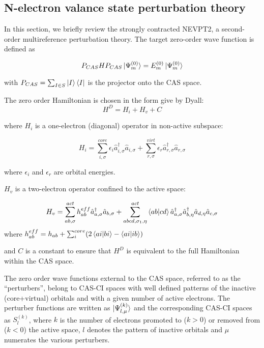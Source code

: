 \subsection{N-electron valance state perturbation theory} 

In this section, we briefly review the strongly contracted NEVPT2\cite{angeli_n-electron_2001, angeli_n-electron_2002}, a second-order multireference perturbation theory. The target zero-order wave function is defined as 

\begin{equation}
P_{CAS}HP_{CAS} \ket{\Psi^{(0)}_m} = E^{(0)}_m \ket{\Psi^{(0)}_m}
\end{equation}

with $P_{CAS} = \sum_{I\in S}\ket{I}\bra{I}$ is the projector onto the CAS space. 

The zero order Hamiltonian is chosen in the form give by Dyall\cite{dyall_choice_1995}:
\begin{equation}
  H^D = H_i + H_v + C
\end{equation}

where $H_i$ is a one-electron (diagonal) operator in non-active subspace:

\begin{equation}
  H_i = \sum_{i,\sigma}^{core} \epsilon_i \hat{a}^\dagger_{i,\sigma}\hat{a}_{i,\sigma} + \sum_{r,\sigma}^{virt} \epsilon_r \hat{a}^\dagger_{r,\sigma}\hat{a}_{r,\sigma}
\end{equation}

where $\epsilon_i $ and $\epsilon_r$ are orbital energies.

$H_v$ is a two-electron operator confined to the active space:

\begin{equation}
  H_v = \sum_{ab,\sigma}^{act} h^{eff}_{ab} \hat{a}^\dagger_{a,\sigma} \hat{a}_{b,\sigma} + \sum_{abcd,\sigma_1,\eta}^{act} \braket{ab|cd} \hat{a}^\dagger_{a,\sigma}\hat{a}^\dagger_{b,\eta}\hat{a}_{d,\eta}\hat{a}_{c,\sigma}
\end{equation}
where $h_{ab}^{eff} = h_{ab} + \sum_{i}^{core} (2\braket{ai|bi}-\braket{ai|ib})$

and $C$ is a constant to ensure that $H^D$ is equivalent to the full Hamiltonian within the CAS space.

The zero order wave functions external to the CAS space, referred to as the ``perturbers'', belong to CAS-CI spaces with well defined patterns of the inactive (core+virtual) orbitals and with a given number of active electrons. The perturber functions are written  as $\ket{\Psi^{(k)}_{l,\mu}}$ and the corresponding CAS-CI spaces as $S_l^{(k)}$, where $k$ is the number of electrons promoted to ($k>0$) or removed from ($k<0$) the active space, $l$ denotes the pattern of inactive orbitals and $\mu$ numerates the various perturbers. 

